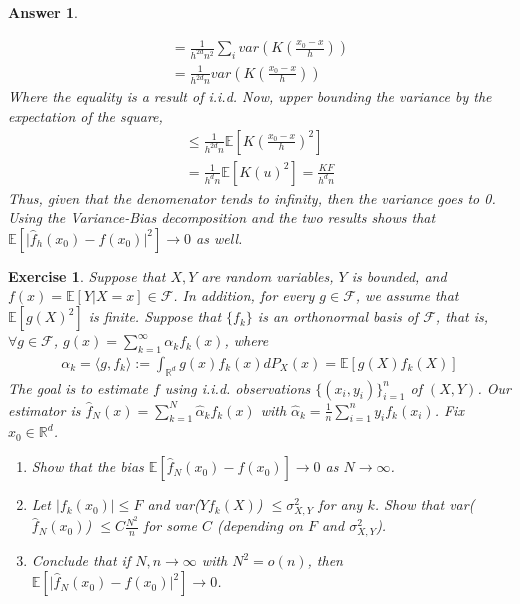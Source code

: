 \documentclass[12pt]{article}
\theoremstyle{colon}
\newtheorem{exercise}{Exercise}
\newtheorem*{answer}{Answer}
\begin{document}
\begin{answer}
\begin{enumerate}[label=\arabic*)]
\begin{gather*}
        = \frac{1}{h^{2d} n^2} \sum_i var \left(K \left( \frac{x_0 - x}{h} \right) \right) \\
        = \frac{1}{h^{2d} n} var\left(K \left( \frac{x_0 - x}{h} \right) \right)
      \end{gather*}
      Where the equality is a result of i.i.d.
      Now, upper bounding the variance by the expectation of the square,
      \begin{gather*}
        \leq \frac{1}{h^{2d} n} \mathbb{E}[K \left( \frac{x_0 - x}{h} \right)^2] \\
        = \frac{1}{h^{d} n} \mathbb{E}[K(u)^2]
        = \frac{K F}{h^d n}
      \end{gather*}
      Thus, given that the denomenator tends to infinity, then the variance goes to 0. Using the Variance-Bias decomposition and the two results shows that $\mathbb{E}[\lvert \widehat{f}_h(x_0) - f(x_0) \rvert^2] \rightarrow 0$ as well.
  \end{enumerate}
\end{answer}

\clearpage

\begin{exercise}
  Suppose that $X, Y$ are random variables, $Y$ is bounded, and $f(x) = \mathbb{E}[ Y | X = x] \in \mathcal{F}$. In addition, for every $g \in \mathcal{F}$, we assume that $\mathbb{E}[g(X)^2]$ is finite. Suppose that $\{ f_k \}$ is an orthonormal basis of $\mathcal{F}$, that is, $\forall g \in \mathcal{F}$, $g(x) = \sum_{k=1}^\infty \alpha_k f_k(x)$, where
  \begin{gather*}
    \alpha_k = \langle g, f_k \rangle := \int_{\mathbb{R}^d} g(x) f_k(x) dP_X(x) = \mathbb{E}[g(X) f_k(X)]
  \end{gather*}
  The goal is to estimate $f$ using i.i.d. observations $\{ (x_i, y_i) \}_{i=1}^n$ of $(X,Y)$. Our estimator is $\widehat{f}_N(x) = \sum_{k=1}^N \widehat{\alpha}_k f_k(x)$ with $\widehat{\alpha}_k = \frac{1}{n} \sum_{i=1}^n y_i f_k(x_i)$. Fix $x_0 \in \mathbb{R}^d$.
  \begin{enumerate}[label=\arabic*)]
    \item Show that the bias $\mathbb{E}[\widehat{f}_N(x_0) - f(x_0)] \rightarrow 0$ as $N \rightarrow \infty$.
    \item Let $\lvert f_k(x_0) \rvert \leq F$ and var($Y f_k(X)$) $\leq \sigma_{X,Y}^2$ for any $k$. Show that var($\widehat{f}_N(x_0)$) $\leq C \frac{N^2}{n}$ for some $C$ (depending on $F$ and $\sigma_{X,Y}^2$).
    \item Conclude that if $N, n \rightarrow \infty$ with $N^2 = o(n)$, then $\mathbb{E}[\lvert \widehat{f}_N(x_0) - f(x_0) \rvert^2] \rightarrow 0$.
  \end{enumerate}
\end{exercise}
\end{document}
